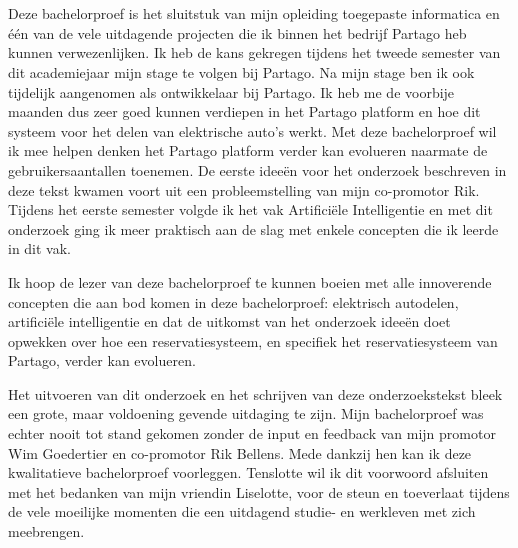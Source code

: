 
\chapter*{}
\label{ch:voorwoord}

Deze bachelorproef is het sluitstuk van mijn opleiding toegepaste informatica en één van de vele uitdagende projecten die ik binnen het bedrijf Partago heb kunnen verwezenlijken. Ik heb de kans gekregen tijdens het tweede semester van dit academiejaar mijn stage te volgen bij Partago. Na mijn stage ben ik ook tijdelijk aangenomen als ontwikkelaar bij Partago. Ik heb me de voorbije maanden dus zeer goed kunnen verdiepen in het Partago platform en hoe dit systeem voor het delen van elektrische auto's werkt. Met deze bachelorproef wil ik mee helpen denken het Partago platform verder kan evolueren naarmate de gebruikersaantallen toenemen. De eerste ideeën voor het onderzoek beschreven in deze tekst kwamen voort uit een probleemstelling van mijn co-promotor Rik. Tijdens het eerste semester volgde ik het vak Artificiële Intelligentie en met dit onderzoek ging ik meer praktisch aan de slag met enkele concepten die ik leerde in dit vak.

Ik hoop de lezer van deze bachelorproef te kunnen boeien met alle innoverende concepten die aan bod komen in deze bachelorproef: elektrisch autodelen, artificiële intelligentie en dat de uitkomst van het onderzoek ideeën doet opwekken over hoe een reservatiesysteem, en specifiek het reservatiesysteem van Partago, verder kan evolueren.  
 
Het uitvoeren van dit onderzoek en het schrijven van deze onderzoekstekst bleek een grote, maar voldoening gevende uitdaging te zijn. Mijn bachelorproef was echter nooit tot stand gekomen zonder de input en feedback van mijn promotor Wim Goedertier en co-promotor Rik Bellens. Mede dankzij hen kan ik deze kwalitatieve bachelorproef voorleggen. Tenslotte wil ik dit voorwoord afsluiten met het bedanken van mijn vriendin Liselotte, voor de steun en toeverlaat tijdens de vele moeilijke momenten die een uitdagend studie- en werkleven met zich meebrengen.

